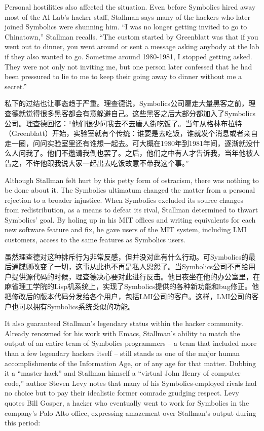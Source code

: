 \ifdefined\eng
Personal hostilities also affected the situation.   Even before Symbolics hired away most of the AI Lab's hacker staff, Stallman says many of the hackers who later joined Symbolics were shunning him. ``I was no longer getting invited to go to Chinatown,'' Stallman recalls. ``The custom started by Greenblatt was that if you went out to dinner, you went around or sent a message asking anybody at the lab if they also wanted to go. Sometime around 1980-1981, I stopped getting asked. They were not only not inviting me, but one person later confessed that he had been pressured to lie to me to keep their going away to dinner without me a secret.''
\fi

\ifdefined\chs
私下的过结也让事态趋于严重。理查德说，Symbolics公司雇走大量黑客之前，理查德就觉得很多黑客都会有意躲避自己。这些黑客之后大部分都加入了Symbolics公司。理查德回忆：“他们很少问我去不去唐人街吃饭了。当年从格林布拉特（Greenblatt）开始，实验室就有个传统：谁要是去吃饭，谁就发个消息或者亲自走一圈，问问实验室里还有谁想一起去。可大概在1980年到1981年间，逐渐就没什么人问我了。他们不邀请我倒也罢了。之后，他们之中有人才告诉我，当年他被人告之，不许他跟我说大家一起出去吃饭故意不带我这个事。”
\fi

\ifdefined\eng
Although Stallman felt hurt by this petty form of ostracism, there was nothing to be done about it.  The Symbolics ultimatum changed the matter from a personal rejection to a broader injustice. When Symbolics excluded its source changes from redistribution, as a means to defeat its rival, Stallman determined to thwart Symbolics' goal. By holing up in his MIT offices and writing equivalents for each new software feature and fix, he gave users of the MIT system, including LMI customers, access to the same features as Symbolics users.
\fi

\ifdefined\chs
虽然理查德对这种排斥行为非常反感，但并没对此有什么行动。可Symbolics的最后通牒则改变了一切，这事从此也不再是私人恩怨了。当Symbolics公司不再给用户提供源代码的时候，理查德决心要对此进行反击。他日夜坐在他的办公室里，在麻省理工学院的Lisp机系统上，实现了Symbolics提供的各种新功能和bug修正。他把修改后的版本代码分发给各个用户，包括LMI公司的客户。这样，LMI公司的客户也可以拥有Symbolics系统类似的功能。
\fi

\ifdefined\eng
It also guaranteed Stallman's legendary status within the hacker community. Already renowned for his work with Emacs, Stallman's ability to match the output of an entire team of Symbolics programmers -- a team that included more than a few legendary hackers itself -- still stands as one of the major human accomplishments of the Information Age, or of any age for that matter. Dubbing it a ``master hack'' and Stallman himself a ``virtual John Henry of computer code,'' author Steven Levy notes that many of his Symbolics-employed rivals had no choice but to pay their idealistic former comrade grudging respect. Levy quotes Bill Gosper, a hacker who eventually went to work for Symbolics in the company's Palo Alto office, expressing amazement over Stallman's output during this period:
\fi

